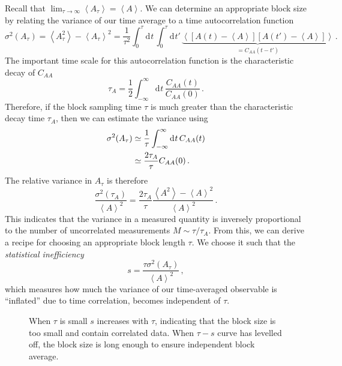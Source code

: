 \documentclass{article}
\theoremstyle{plain}\theoremheaderfont{\normalfont\itshape}\theorembodyfont{\rmfamily}\theoremseparator{.}\newtheorem*{rem}{Remark}\newtheorem*{ex}{Example}\newtheorem*{proof}{Proof}\newtheorem*{altp}{Alternative proof}
\theoremstyle{plain}\theoremheaderfont{\normalfont\bfseries}\theorembodyfont{\rmfamily}\theoremseparator{.}\newtheorem{thm}{Theorem}[section]\newtheorem{lem}[thm]{Lemma}\newtheorem{prop}[thm]{Proposition}\newtheorem*{cor}{Corollary}\newtheorem{defn}[thm]{Definition}\newtheorem{clm}[thm]{Claim}\newtheorem{clminproof}{Claim}\newtheorem{alg}[thm]{Algorithm}\newtheorem{hyp}[thm]{Hypothesis}\newtheorem{law}[thm]{Law}
\theoremstyle{break}\theoremheaderfont{\normalfont\itshape}\theorembodyfont{\rmfamily}\theoremseparator{.\medskip}\newtheorem*{proofskip}{Proof}\newtheorem*{exs}{Examples}\newtheorem*{rems}{Remarks}
\theoremstyle{break}\theoremheaderfont{\normalfont\bfseries}\theorembodyfont{\rmfamily}\theoremseparator{.\medskip}\newtheorem{lemskip}[thm]{Lemma}\newtheorem{defnskip}[thm]{Definition}\newtheorem{propskip}[thm]{Proposition}\newtheorem{thmskip}[thm]{Theorem}
\numberwithin{equation}{section}
\newcommand{\dd}[2][]{\mathrm{d}^{#1} #2\,}
\newcommand{\eval}[1]{\left\langle #1 \right\rangle}
\begin{document}
    Recall that \(\lim_{\tau\to\infty}\eval{A_\tau}=\eval{A}\). We can determine an appropriate block size by relating the variance of our time average to a time autocorrelation function
    \begin{equation}
        \sigma^2(A_\tau)=\eval{A_\tau^2}-\eval{A_\tau}^2=\frac{1}{\tau^2}\int_{0}^{\tau}\dd{t}\int_{0}^{\tau}\dd{t'}\underbrace{\eval{[A(t)-\eval{A}][A(t')-\eval{A}]}}_{=C_{AA}(t-t')}\,.
    \end{equation}
    The important time scale for this autocorrelation function is the characteristic decay of \(C_{AA}\)
    \begin{equation}
        \tau_A=\frac{1}{2}\int_{-\infty}^{\infty}\dd{t}\frac{C_{AA}(t)}{C_{AA}(0)}\,.
    \end{equation}
    Therefore, if the block sampling time \(\tau\) is much greater than the characteristic decay time \(\tau_A\), then we can estimate the variance using
    \begin{align}
        \sigma^2(A_\tau)&\simeq\frac{1}{\tau}\int_{-\infty}^{\infty}\dd{t}C_{AA}(t)\notag\\
        &\simeq\frac{2\tau_A}{\tau}C_{AA}(0)\,.
    \end{align}
    The relative variance in \(A_\tau\) is therefore
    \begin{equation}
        \frac{\sigma^2(\tau_A)}{\eval{A}^2}=\frac{2\tau_A}{\tau}\frac{\eval{A^2}-\eval{A}^2}{\eval{A}^2}\,.
    \end{equation}
    This indicates that the variance in a measured quantity is inversely proportional to the number of uncorrelated measurements \(M\sim \tau/\tau_A\). From this, we can derive a recipe for choosing an appropriate block length \(\tau\). We choose it such that the \textit{statistical inefficiency}
    \begin{equation}
        s=\frac{\tau\sigma^2(A_\tau)}{\eval{A}^2}\,,
    \end{equation}
    which measures how much the variance of our time-averaged observable is ``inflated'' due to time correlation, becomes independent of \(\tau\).
    \begin{figure}
        \centering
        \caption{When \(\tau\) is small \(s\) increases with \(\tau\), indicating that the block size is too small and contain correlated data. When \(\tau-s\) curve has levelled off, the block size is long enough to ensure independent block average.}
    \end{figure}
\end{document}
